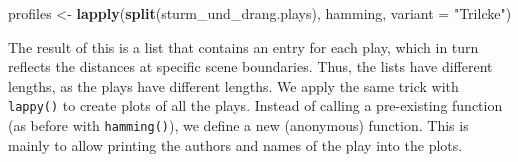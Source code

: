 \documentclass[]{book}
\newenvironment{Shaded}{\begin{snugshade}}{\end{snugshade}}
\newcommand{\CommentTok}[1]{\textcolor[rgb]{0.56,0.35,0.01}{\textit{#1}}}
\newcommand{\ControlFlowTok}[1]{\textcolor[rgb]{0.13,0.29,0.53}{\textbf{#1}}}
\newcommand{\DataTypeTok}[1]{\textcolor[rgb]{0.13,0.29,0.53}{#1}}
\newcommand{\DecValTok}[1]{\textcolor[rgb]{0.00,0.00,0.81}{#1}}
\newcommand{\KeywordTok}[1]{\textcolor[rgb]{0.13,0.29,0.53}{\textbf{#1}}}
\newcommand{\NormalTok}[1]{#1}
\newcommand{\OperatorTok}[1]{\textcolor[rgb]{0.81,0.36,0.00}{\textbf{#1}}}
\newcommand{\StringTok}[1]{\textcolor[rgb]{0.31,0.60,0.02}{#1}}
\begin{document}
\begin{Shaded}
\begin{Highlighting}[]
\NormalTok{profiles <-}\StringTok{ }\KeywordTok{lapply}\NormalTok{(}\KeywordTok{split}\NormalTok{(sturm_und_drang.plays), hamming, }\DataTypeTok{variant =} \StringTok{"Trilcke"}\NormalTok{)}
\end{Highlighting}
\end{Shaded}

The result of this is a list that contains an entry for each play, which in turn reflects the distances at specific scene boundaries. Thus, the lists have different lengths, as the plays have different lengths. We apply the same trick with \texttt{lappy()} to create plots of all the plays. Instead of calling a pre-existing function (as before with \texttt{hamming()}), we define a new (anonymous) function. This is mainly to allow printing the authors and names of the play into the plots.

\begin{Shaded}
\end{Shaded}
\end{document}
